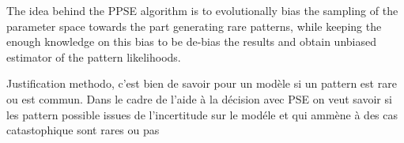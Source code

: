 \documentclass[10pt,letterpaper]{article}
\theoremstyle{definition}
\theoremstyle{remark}
\begin{document}
The idea behind the PPSE algorithm is to evolutionally bias the sampling of the parameter space towards the part generating rare patterns, while keeping the enough knowledge on this bias to be de-bias the results and obtain unbiased estimator of the pattern likelihoods.



{\color{red} Justification methodo, c'est bien de savoir pour un modèle si un pattern est rare ou est commun. Dans le cadre de l'aide à la décision avec PSE on veut savoir si les pattern possible issues de l'incertitude sur le modéle et qui ammène à des cas catastophique sont rares ou pas} 


%
%
%
%
%
%
%
\end{document}
